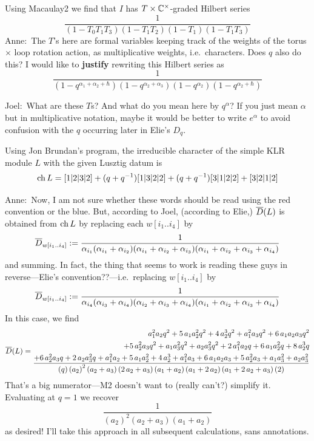 \documentclass[11pt]{article}
\newcommand{\anne}[1]{{\color{pink!50!blue}Anne:~#1}}
\newcommand{\joel}[1]{{\color{red!50!orange}Joel:~#1}}
\newcommand{\todo}[1]{{\color{red!50!white}\textbf{#1}}} %
\begin{document}
\begin{description}
Using Macaulay2 we find that $I$ has $T\times\mathbb C^\times$-graded Hilbert series
\[
    \frac{1}{\left(1-{T}_{0}{T}_{1}{T}_{3}\right)\left(1-{T}_{1}{T}_{2}\right)\left(1-{T}_{1}\right)\left(1-{T}_{1}{T}_{3}\right)}    
\]
\anne{The $T$'s here are formal variables keeping track of the weights of the torus $\times$ loop rotation action, as multiplicative weights, i.e.\ characters. 
Does $q$ also do this? I would like to \todo{justify} rewriting this Hilbert series as 
\[
    \frac{1}{(1 - q^{\alpha_1 + \alpha_2 + \hbar})(1-q^{\alpha_2 + \alpha_3})(1-q^{\alpha_2})(1-q^{\alpha_2 + \hbar})}    
\]
}

\joel{What are these $T$s?  And what do you mean here by $ q^\alpha$? If you just mean $ \alpha$ but in multiplicative notation, maybe it would be better to write $ e^\alpha$ to avoid confusion with the $ q $ occurring later in Elie's $D_q$.}

Using Jon Brundan's program, the irreducible character of the simple KLR module $L$ with the given Lusztig datum is 
\[
    \operatorname{ch} L = [1|2|3|2]+(q+q^{-1})[1|3|2|2]+(q+q^{-1})[3|1|2|2]+[3|2|1|2]
\]
\anne{Now, I am not sure whether these words should be read using the red convention or the blue. But, according to Joel, (according to Elie,) $\overline{D}(L)$  is obtained from $\operatorname{ch} L$ by replacing each $w[i_1..i_4]$ by 
$$\overline{D}_{w[i_1..i_4]}:= \frac 1 {\alpha_{i_1}(\alpha_{i_1} + \alpha_{i_2})(\alpha_{i_1} + \alpha_{i_2} + \alpha_{i_3})(\alpha_{i_1}+\alpha_{i_2} + \alpha_{i_3}+\alpha_{i_4})}$$ and summing. In fact, the thing that seems to work is reading these guys in reverse---Elie's convention??---i.e.\ replacing $w[i_1..i_4]$ by 
$$\overline{D}_{w[i_1..i_4]}:= \frac 1 {\alpha_{i_4}(\alpha_{i_3} + \alpha_{i_4})(\alpha_{i_2} + \alpha_{i_3} + \alpha_{i_4})(\alpha_{i_1}+\alpha_{i_2} + \alpha_{i_3}+\alpha_{i_4})}$$ 
In this case, we find %
{\tiny
$$
\overline{D} (L) =
\begin{aligned}{a}_{1}^{2}{a}_{2}q^{2}+5\,{a}_{1}{a}_{2}^{2}q^{2}+4\,{a}_{2}^{3}q^{2}+{a}_{1}^{2}{a}_{3}q^{2}+6\,{a}_{1}{a}_{2}{a}_{3}q^{2}\\
    +5\,{a}_{2}^{2}{a}_{3}q^{2}+{a}_{1}{a}_{3}^{2}q^{2}+{a}_{2}{a}_{3}^{2}q^{2}+2\,{a}_{1}^{2}{a}_{2}q+6\,{a}_{1}{a}_{2}^{2}q+8\,{a}_{2}^{3}q \\ 
    \frac{+6\,{a}_{2}^{2}{a}_{3}q+2\,{a}_{2}{a}_{3}^{2}q+{a}_{1}^{2}{a}_{2}+5\,{a}_{1}{a}_{2}^{2}+4\,{a}_{2}^{3}+{a}_{1}^{2}{a}_{3}+6\,{a}_{1}{a}_{2}{a}_{3}+5\,{a}_{2}^{2}{a}_{3}+{a}_{1}{a}_{3}^{2}+{a}_{2}{a}_{3}^{2}}{\left(q\right)\left({{a}_{2}}\right)^{2}\left({a}_{2}+{a}_{3}\right)\left(2\,{a}_{2}+{a}_{3}\right)\left({a}_{1}+{a}_{2}\right)\left({a}_{1}+2\,{a}_{2}\right)\left({a}_{1}+2\,{a}_{2}+{a}_{3}\right)\left(2\right)}
\end{aligned}
$$}
That's a big numerator---M2 doesn't want to (really can't?) simplify it. 
Evaluating at $q = 1$ we recover
$$\frac{1}{\left({{a}_{2}}\right)^{2}\left({a}_{2}+{a}_{3}\right)\left({a
      }_{1}+{a}_{2}\right)}$$
as desired! I'll take this approach in all subsequent calculations, sans annotations. 

}
\end{description}
\end{document}
